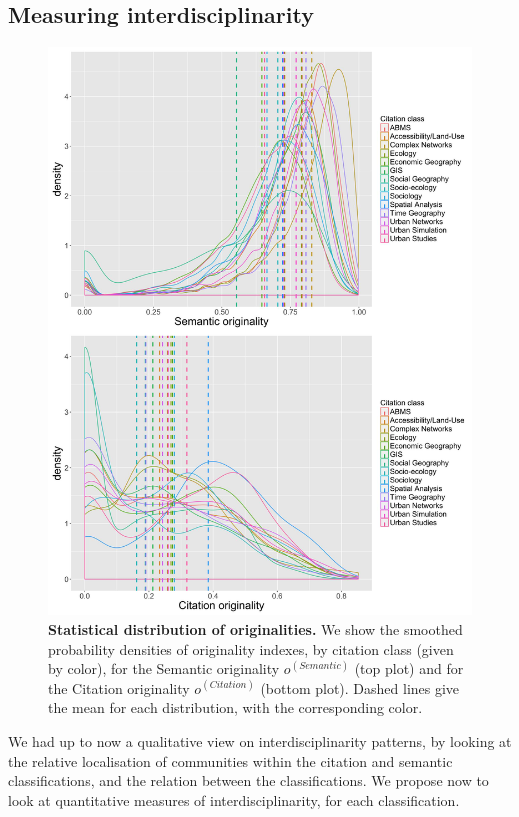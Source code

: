 \subsection*{Measuring interdisciplinarity}
\label{subsec:interdisc}


\begin{figure}
\centering
\includegraphics[width=1.3\textwidth]{figures/Fig11.jpg}
\caption{\textbf{Statistical distribution of originalities.} We show the smoothed probability densities of originality indexes, by citation class (given by color), for the Semantic originality $o^{(Semantic)}$ (top plot) and for the Citation originality $o^{(Citation)}$ (bottom plot). Dashed lines give the mean for each distribution, with the corresponding color.}
\label{fig:firstorderint}
\end{figure}


We had up to now a qualitative view on interdisciplinarity patterns, by looking at the relative localisation of communities within the citation and semantic classifications, and the relation between the classifications. We propose now to look at quantitative measures of interdisciplinarity, for each classification.


